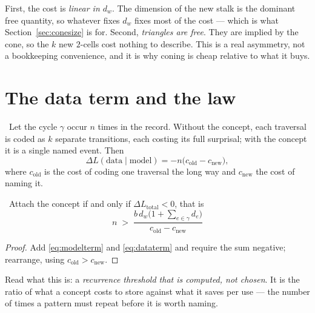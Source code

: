 \begin{remark}
First, the cost is \emph{linear in $d_w$}. The dimension of the new
stalk is the dominant free quantity, so whatever fixes $d_w$ fixes most
of the cost --- which is what Section~\ref{sec:conesize} is for.
Second, \emph{triangles are free}. They are implied by the cone, so the
$k$ new $2$-cells cost nothing to describe. This is a real asymmetry,
not a bookkeeping convenience, and it is why coning is cheap relative to
what it buys.
\end{remark}

\section{The data term and the law}

\begin{proposition}\label{prop:dataterm}
\Proved\ Let the cycle $\gamma$ occur $n$ times in the record. Without
the concept, each traversal is coded as $k$ separate transitions, each
costing its full surprisal; with the concept it is a single named event.
Then
\begin{equation}\label{eq:dataterm}
  \Delta L(\text{data}\mid\text{model})=-n\bigl(c_{\text{old}}-c_{\text{new}}\bigr),
\end{equation}
where $c_{\text{old}}$ is the cost of coding one traversal the long way
and $c_{\text{new}}$ the cost of naming it.
\end{proposition}

\begin{theorem}\label{thm:growthlaw}
\Proved\ Attach the concept if and only if $\Delta L_{\text{total}}<0$,
that is
\begin{equation}\label{eq:growthlaw}
  \boxed{\ n\;>\;
  \frac{b\,d_w\bigl(1+\sum_{e\in\gamma}d_e\bigr)}
       {c_{\text{old}}-c_{\text{new}}}\ }
\end{equation}
\end{theorem}
\begin{proof}
Add \eqref{eq:modelterm} and \eqref{eq:dataterm} and require the sum
negative; rearrange, using $c_{\text{old}}>c_{\text{new}}$.
\end{proof}

\begin{intu}\Intu
Read what this is: a \emph{recurrence threshold that is computed, not
chosen}. It is the ratio of what a concept costs to store against what
it saves per use --- the number of times a pattern must repeat before it
is worth naming.
\end{intu}

